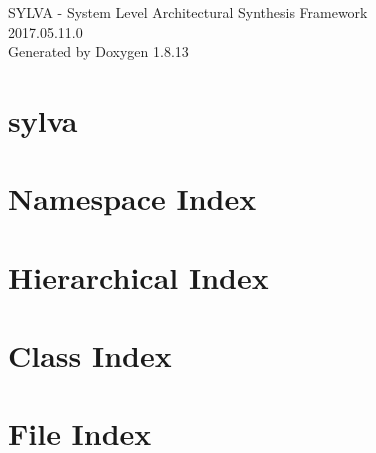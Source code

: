 \documentclass[twoside]{book}
\newcommand{\+}{\discretionary{\mbox{\scriptsize$\hookleftarrow$}}{}{}}
\newcommand{\clearemptydoublepage}{%
  \newpage{\pagestyle{empty}\cleardoublepage}%
}
\begin{document}
\hypersetup{pageanchor=false,
             bookmarksnumbered=true,
             pdfencoding=unicode
            }
\begin{titlepage}
\vspace*{7cm}
\begin{center}%
{\Large S\+Y\+L\+VA -\/ System Level Architectural Synthesis Framework \\[1ex]\large 2017.\+05.\+11.\+0 }\\
\vspace*{1cm}
{\large Generated by Doxygen 1.8.13}\\
\end{center}
\end{titlepage}
\clearemptydoublepage
{}
\tableofcontents
\clearemptydoublepage
{}
\hypersetup{pageanchor=true}

\chapter{sylva}
\label{md__r_e_a_d_m_e}

\chapter{Namespace Index}

\chapter{Hierarchical Index}

\chapter{Class Index}

\chapter{File Index}

\end{document}
